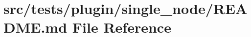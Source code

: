 \hypertarget{src_2tests_2plugin_2single__node_2README_8md}{}\section{src/tests/plugin/single\+\_\+node/\+R\+E\+A\+D\+ME.md File Reference}
\label{src_2tests_2plugin_2single__node_2README_8md}
